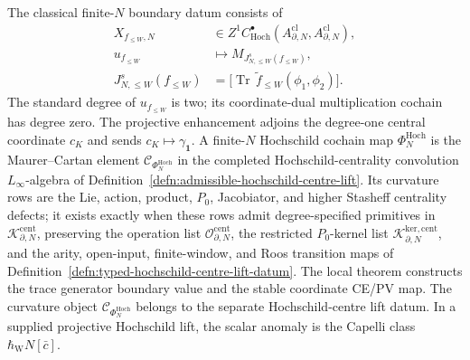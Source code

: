 \documentclass[11pt]{memoir}
\begin{document}
\begin{thm}
    The classical finite-\(N\) boundary datum consists of
    \[
      \begin{aligned}
      X_{f_{\leq W},N}
        &\in Z^1C^\bullet_{\mathrm{Hoch}}
          (A^{\mathrm{cl}}_{\partial,N},A^{\mathrm{cl}}_{\partial,N}),\\
      u_{f_{\leq W}}
        &\longmapsto M_{J^s_{N,\leq W}(f_{\leq W})},\\
      J^s_{N,\leq W}(f_{\leq W})
        &=
        \bigl[
          \operatorname{Tr}\,
          \tilde f_{\leq W}(\phi_1,\phi_2)
        \bigr].
      \end{aligned}
    \]
    The standard degree of \(u_{f_{\leq W}}\) is two; its coordinate-dual
    multiplication cochain has degree zero.
    The projective enhancement adjoins the degree-one central coordinate
    \(c_K\) and sends \(c_K\mapsto\gamma_{\mathbf 1}\).  A finite-\(N\)
    Hochschild cochain map \(\Phi_N^{\mathrm{Hoch}}\) is the
    Maurer--Cartan element
    \(\mathcal C_{\Phi_N^{\mathrm{Hoch}}}\) in the completed
    Hochschild-centrality convolution \(L_\infty\)-algebra of
    Definition~\ref{defn:admissible-hochschild-centre-lift}.  Its
    curvature rows are the Lie, action, product, \(P_0\), Jacobiator,
    and higher Stasheff centrality defects; it exists exactly when these
	    rows admit degree-specified primitives in
	    \(\mathcal K^{\mathrm{cent}}_{\partial,N}\), preserving the
	    operation list \(\mathcal O^{\mathrm{cent}}_{\partial,N}\), the
	    restricted \(P_0\)-kernel list
	    \(\mathcal K^{\mathrm{ker,cent}}_{\partial,N}\), and the arity,
	    open-input, finite-window, and Roos transition maps of
		    Definition~\ref{defn:typed-hochschild-centre-lift-datum}.  The
		    local theorem constructs the trace generator boundary value and the stable
	    coordinate CE/PV map.  The curvature object
	    \(\mathcal C_{\Phi_N^{\mathrm{Hoch}}}\) belongs to the separate
	    Hochschild-centre lift datum.  In a supplied projective
	    Hochschild lift, the scalar anomaly is the Capelli class
    \(\hbar_{\mathrm{W}}N[\bar c]\).


\end{thm}
\end{document}
